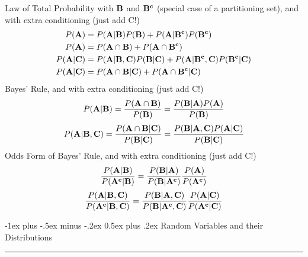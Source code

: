 \documentclass[10pt,landscape]{article}
\makeatletter
\theoremstyle{definition}
\renewcommand{\section}{\@startsection{section}{1}{0mm}%
                                {-1ex plus -.5ex minus -.2ex}%
                                {0.5ex plus .2ex}%
                                {\normalfont\large\bfseries}}
\renewcommand{\subsection}{\@startsection{subsection}{2}{0mm}%
                                {-1explus -.5ex minus -.2ex}%
                                {0.5ex plus .2ex}%
                                {\normalfont\normalsize\bfseries}}
\makeatother
\begin{document}
\begin{multicols}{3}
Law of Total Probability with ${\bf B}$ and ${\bf B^c}$ (special case of a partitioning set), and with extra conditioning (just add C!)
   \begin{align*} 
P({\bf A}) &= P({\bf A} | {\bf B})P({\bf B}) + P({\bf A} | {\bf B^c})P({\bf B^c}) \\
P({\bf A}) &= P({\bf A} \cap {\bf B})+ P({\bf A} \cap {\bf B^c}) \\
P({\bf A} | {\bf C}) &= P({\bf A} | {\bf B}, {\bf C})P({\bf B} | {\bf C}) + P({\bf A} | {\bf B^c}, {\bf C})P({\bf B^c} | {\bf C}) \\
P({\bf A} | {\bf C}) &= P({\bf A} \cap {\bf B} | {\bf C})+ P({\bf A} \cap {\bf B^c} | {\bf C})
   \end{align*} 
Bayes' Rule, and with extra conditioning (just add C!)
         \[P({\bf A}|{\bf B}) = \frac{P({\bf A} \cap {\bf B})}{P({\bf B})} = \frac{P({\bf B}|{\bf A})P({\bf A})}{P({\bf B})}\]
         \[P({\bf A}|{\bf B}, {\bf C}) = \frac{P({\bf A} \cap {\bf B} | {\bf C})}{P({\bf B} | {\bf C})} = \frac{P({\bf B}|{\bf A}, {\bf C})P({\bf A} | {\bf C})}{P({\bf B} | {\bf C})}\]
Odds Form of Bayes' Rule, and with extra conditioning (just add C!)
\[\frac{P({\bf A}| {\bf B})}{P({\bf A^c}| {\bf B})} = \frac{P({\bf B}|{\bf A})}{P({\bf B}| {\bf A^c})}\frac{P({\bf A})}{P({\bf A^c})}\]
\[\frac{P({\bf A}| {\bf B}, {\bf C})}{P({\bf A^c}| {\bf B}, {\bf C})} = \frac{P({\bf B}|{\bf A}, {\bf C})}{P({\bf B}| {\bf A^c}, {\bf C})}\frac{P({\bf A} | {\bf C})}{P({\bf A^c} | {\bf C})}\]

\section{Random Variables and their Distributions}\smallskip \hrule height 2pt \smallskip


   

\end{multicols}
\end{document}
